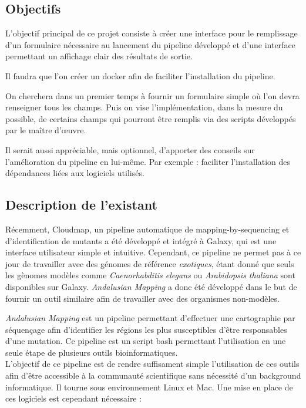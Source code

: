 \documentclass[12pt]{article}
\begin{document}
\subsection{Objectifs}

L’objectif principal de ce projet consiste à créer une interface pour le remplissage d'un formulaire nécessaire au lancement du pipeline développé et d'une interface permettant un affichage clair des résultats de sortie.

Il faudra que l'on créer un docker afin de faciliter l’installation du pipeline. 

On cherchera dans un premier temps à fournir un formulaire simple où l'on devra renseigner tous les champs. Puis on vise l'implémentation, dans la mesure du possible, de certains champs qui pourront être remplis via des scripts développés par le maître d’œuvre.

Il serait aussi appréciable, mais optionnel, d’apporter des conseils sur l’amélioration du pipeline en lui-même. Par exemple : faciliter l’installation des dépendances liées aux logiciels utilisés.

\subsection{Description de l'existant}

Récemment, Cloudmap, un pipeline automatique de mapping-by-sequencing et d'identification de mutants a été développé et intégré à Galaxy, qui est une interface utilisateur simple et intuitive.
Cependant, ce pipeline ne permet pas à ce jour de travailler avec des génomes de référence \textit{exotiques}, étant donné que seuls les gènomes modèles comme \textit{Caenorhabditis elegans} ou \textit{Arabidopsis thaliana} sont disponibles sur Galaxy.
\textit{Andalusian Mapping} a donc été développé dans le but de fournir un outil similaire afin de travailler avec des organismes non-modèles.

\textit{Andalusian Mapping} est un pipeline permettant d'effectuer une cartographie par séquençage afin d'identifier les régions les plus susceptibles d'être responsables d'une mutation.
Ce pipeline est un script bash permettant l'utilisation en une seule étape de plusieurs outils bioinformatiques. \\

L'objectif de ce pipeline est de rendre suffisament simple l'utilisation de ces outils afin d'être accessible à la communauté scientifique sans nécessité d'un background informatique. Il tourne sous environnement Linux et Mac.
Une mise en place de ces logiciels est cependant nécessaire :
\end{document}
